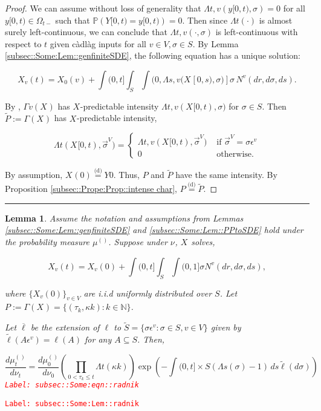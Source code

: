 \documentclass[12pt]{article}
\newcommand{\mb}{\mathbb}
\newcommand{\ov}{\overline}
\newcommand{\te}{\text}
\newcommand{\ep}{\epsilon}
\newcommand{\tr}{\textcolor{red}}
\newcommand{\labe}[1]{\tr{\texttt{Label: #1}}}
\newcommand{\ind}{\hspace{24pt}}
\newcommand{\lin}{\rule{\linewidth}{0.4 pt}}
\newcommand{\pr}{\mb{P}}							%
\newcommand{\deq}{\overset{\text{(d)}}{=}}			%
\newcommand{\defeq}{:=}								%
\renewcommand{\v}{v}							%
\renewcommand{\S}{S}							%
\newcommand{\s}{\sigma}							%
\newcommand{\sv}{\vec{\s}}						%
\newcommand{\ev}{\ep}							%
\renewcommand{\t}{t}							%
\newcommand{\sset}{\Omega}						%
\renewcommand{\tt}{s}							%
\newcommand{\X}{X}								%
\newcommand{\vind}[1]{^{#1}}					%
\newcommand{\vsi}[1]{^{#1}}						%
\newcommand{\cind}[1]{_{#1}}					%
\newcommand{\tp}[1]{(#1)}						%
\newcommand{\tip}[1]{#1}						%
\newcommand{\ts}[1]{_{#1}}						%
\newcommand{\sln}[1]{^{(#1)}}					%
\newcommand{\poiss}{N}							%
\newcommand{\Sm}{\ell}							%
\renewcommand{\r}{r}							%
\newcommand{\alt}[1]{\widetilde{#1}}			%
\newcommand{\indx}[1]{_{#1}}					%
\newcommand{\m}{\mu}							%
\newcommand{\mm}{\nu}							%
\newcommand{\XX}{Y}								%
\newcommand{\rt}{\tau}							%
\renewcommand{\it}{k}							%
\newcommand{\pmap}{\Gamma}						%
\renewcommand{\mark}{\kappa}					%
\newcommand{\rp}{P}								%
\newcommand{\typset}{A}							%
\newcommand{\ratee}{\Lambda}					%
\newcommand{\xx}{y}								%
\newtheorem{lem}[thms]{Lemma}
\begin{document}
\begin{proof}

We can assume without loss of generality that \(\ratee{\t,\v}(\xx{}{[0,\t)},\s) = 0\) for all \(\xx{}{[0,\t)}\in \sset\vsi{}\ts{\t-}\) such that \(\pr(\XX{}{[0,\t)} = \xx{}{[0,\t)}) = 0\). Then since \(\ratee{\t}(\cdot)\) is almost surely left-continuous, we can conclude that \(\ratee{\t,\v}(\cdot,\s)\) is left-continuous with respect to \(\t\) given c\`adl\`ag inputs for all \(\v\in V,\s\in\S\). By Lemma \ref{subsec::Some:Lem::genfiniteSDE}, the following equation has a unique solution:

\[\X\cind{\v}\tp{\t} = \X\cind{0}\tp{\v} + \int{(0,\t]}\int_\S\int{(0,\ratee{\tt,\v}(\X\cind{}\tip{[0,\tt)},\s)]}  \s\,\poiss\vind{\v}(d\r,d\s,d\tt).\]

By \cite[Exercise 14.7.1]{DalVer08}, \(\pmap{\v}(\X\cind{}\tip{})\) has \(\X\cind{}\tip{}\)-predictable intensity \(\ratee{\t,\v}(\X\cind{}\tip{[0,\t)},\s)\) for \(\s \in \S\). Then \(\alt{\rp{}} \defeq \pmap{}(\X\cind{}\tip{})\) has \(\X\cind{}\tip{}\)-predictable intensity,

\[\ratee{\t}(\X\cind{}\tip{[0,\t)},\sv\cind{}\vsi{V}) = \begin{cases}
\ratee{\t,\v}(\X\cind{}\tip{[0,\t)},\sv\cind{}\vsi{V}) &\te{ if } \sv\cind{}\vsi{V} = \s\ev\vind{\v}\\
0&\te{ otherwise.}
\end{cases}\]

By assumption, \(\X\cind{}\tp{0} \deq \XX{}{0}\). Thus, \(\rp{}\) and \(\alt{\rp{}}\) have the same intensity. By Proposition \ref{subsec::Prope:Prop::intense char}, \(\rp{} \deq \alt{\rp{}}\).
\end{proof}
\lin

\begin{lem}
Assume the notation and assumptions from Lemmas \ref{subsec::Some:Lem::genfiniteSDE} and \ref{subsec::Some:Lem::PPtoSDE} hold under the probability measure \(\m\sln{}\ts{}\). Suppose under \(\mm\vind{}\ts{}\), \(\X\cind{}\tip{}\) solves,

\[\X\cind{\v}\tp{\t} = \X\cind{\v}\tp{0} +\int{(0,\t]}\int_\S\int{(0,1]} \s \poiss\vind{\v}(d\r,d\s,d\tt),\]

where \(\{\X\cind{\v}\tp{0}\}_{\v \in V}\) are i.i.d uniformly distributed over \(\S\). Let \(\rp{} \defeq \pmap{}(\X\cind{}\tip{}) = \{(\rt\indx{\it},\mark{\it}):\it\in \mb{N}\}\).

\ind Let \(\ov{\ell}\) be the extension of \(\Sm\) to \(\alt{\S} = \{\s\ev\vind{\v}: \s \in \S, \v \in V\}\) given by \(\alt{\Sm}(\typset\ev\vind{\v}) = \Sm(\typset)\) for any \(\typset \subseteq \S\). Then,

\begin{equation}
\frac{d\m\sln{}\ts{\t}}{d\mm\vind{}\ts{\t}}= \frac{d\m\sln{}\ts{0}}{d\mm\vind{}\ts{0}}\left(\prod_{0< \rt\indx{\it}\leq \t} \ratee{\t}(\mark{\it})\right)\exp\left(-\int{(0,\t]\times \S} (\ratee{\tt}(\s) - 1)\,d\tt\alt{\Sm}(d\s)\right)
\label{subsec::Some:eqn::radnik}
\end{equation}
\labe{subsec::Some:eqn::radnik}
\label{subsec::Some:Lem::radnik}
\end{lem}
\labe{subsec::Some:Lem::radnik}
\end{document}
